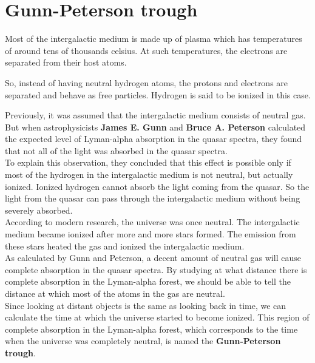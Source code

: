 \documentclass[a4,12pt,oneside]{report}
\begin{document}
	\section{Gunn-Peterson trough}
	Most of the intergalactic medium is made up of plasma which has temperatures of around tens of thousands celsius.
	At such temperatures, the electrons are separated from their host atoms.
	
	So, instead of having neutral hydrogen atoms, the protons and electrons are separated and behave as free particles. Hydrogen is said to be ionized in this case.
	
	Previously, it was assumed that the intergalactic medium consists of neutral gas. But when astrophysicists {\bf James E. Gunn} and {\bf Bruce A. Peterson} calculated the expected level of 
        Lyman-alpha absorption in the quasar spectra, they found that not all of the light was absorbed in the quasar spectra. 
        \\
        To explain this observation, they concluded that this effect is possible only if most of the hydrogen in the intergalactic medium is not neutral, but actually 
        ionized. Ionized hydrogen cannot absorb the light coming from the quasar.
        So the light from the quasar can pass through the intergalactic medium without being severely absorbed.
        \\
        According to modern research, the universe was once neutral. The intergalactic medium became ionized after more and more stars
        formed. The emission from these stars heated the gas and ionized the intergalactic medium.
        \\
        As calculated by Gunn and Peterson, a decent amount of neutral gas will cause complete absorption in the quasar spectra.
        By studying at what distance there is complete absorption in the Lyman-alpha forest, we should be able to tell the distance at
        which most of the atoms in the gas are neutral.
        \\
        Since looking at distant objects is the same as looking back in time, we can calculate the time at which the universe started to become ionized.
        This region of complete absorption in the Lyman-alpha forest, which corresponds to the time when the universe was completely neutral, is named the 
        {\bf Gunn-Peterson trough}.
        
     
        
	
\end{document}
